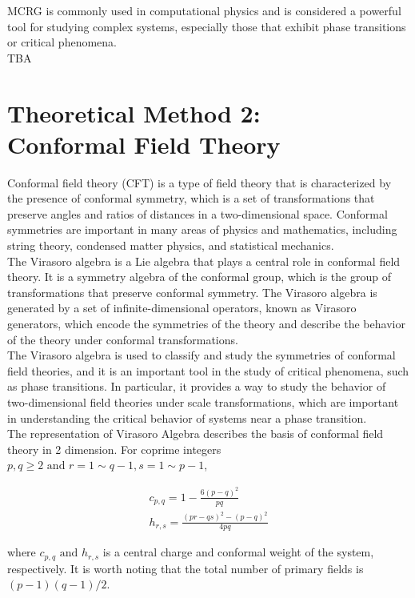 \documentclass[%
 reprint,
 amsmath,amssymb,
 aps,
]{revtex4-2}
\begin{document}
MCRG is commonly used in computational physics and is considered a powerful tool for 
studying complex systems, especially those that exhibit phase transitions or 
critical phenomena. \\

TBA

\section{\label{sec:cft}Theoretical Method 2: \\ Conformal Field Theory}
Conformal field theory (CFT) is a type of field theory that is characterized by the 
presence of conformal symmetry, which is a set of transformations that preserve angles 
and ratios of distances in a two-dimensional space. Conformal symmetries are important 
in many areas of physics and mathematics, including string theory, condensed matter 
physics, and statistical mechanics. \\

The Virasoro algebra is a Lie algebra that plays a central role in conformal field theory. 
It is a symmetry algebra of the conformal group, which is the group of transformations that 
preserve conformal symmetry. The Virasoro algebra is generated by a set of 
infinite-dimensional operators, known as Virasoro generators, which encode the symmetries 
of the theory and describe the behavior of the theory under conformal transformations. \\

The Virasoro algebra is used to classify and study the symmetries of conformal 
field theories, and it is an important tool in the study of critical phenomena, 
such as phase transitions. In particular, it provides a way to study the behavior of 
two-dimensional field theories under scale transformations, which are important in 
understanding the critical behavior of systems near a phase transition. \\

The representation of Virasoro Algebra describes the basis of conformal field theory in 2 
dimension. For coprime integers $p, q \geq 2 \text{ and } r=1\sim q-1, s=1\sim p-1$,

\begin{gather}
c_{p,q} = 1-\frac{6(p-q)^2}{pq} \\
h_{r,s} = \frac{(pr-qs)^2-(p-q)^2}{4pq}
\end{gather}

where $c_{p,q} \text{ and } h_{r,s}$ is a central charge and conformal weight of the system, 
respectively. It is worth noting that the total number of primary fields is $(p-1)(q-1)/2$.\\
\end{document}
